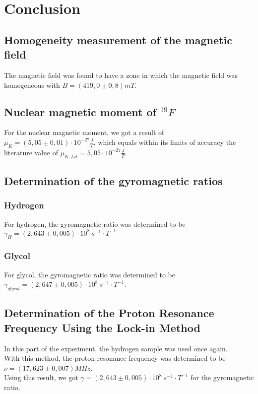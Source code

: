 \clearpage
\section{Conclusion}
\subsection{Homogeneity measurement of the magnetic field}
The magnetic field was found to have a zone in which the magnetic field was homogeneous with $B=(419,0\pm0,8)mT$.
\subsection{Nuclear magnetic moment of $^{19}F$}
For the nuclear magnetic moment, we got a result of $\mu_{K}=(5,05\pm0,01)\cdot 10^{-27}\frac{J}{T}$, which equals within its limits of accuracy the literature value of $\mu_{K,Lit}=5,05\cdot10^{-27} \frac{J}{T}$.
\subsection{Determination of the gyromagnetic ratios}
\subsubsection{Hydrogen}
For hydrogen, the gyromagnetic ratio was determined to be $\gamma_{H}=(2,643\pm0,005)\cdot10^{8} ~s^{-1}\cdot T^{-1}$
\subsubsection{Glycol}
For glycol, the gyromagnetic ratio was determined to be $\gamma_{glycol}=(2,647\pm0,005)\cdot 10^{8} ~s^{-1}\cdot T^{-1}$.
\subsection{Determination of the Proton Resonance Frequency Using the Lock-in Method}
In this part of the experiment, the hydrogen sample was used once again.\\
With this method, the proton resonance frequency was determined to be $\nu=(17,623\pm0,007)MHz$. \\
Using this result, we got $\gamma=(2,643\pm0,005)\cdot 10^{8} ~s^{-1}\cdot T^{-1}$ for the gyromagnetic ratio.
